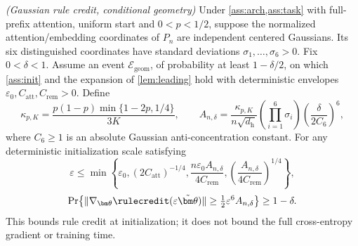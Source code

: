 \item \emph{(Gaussian rule credit, conditional geometry)}
Under \cref{ass:arch,ass:task} with full-prefix attention, uniform start and
$0<p<1/2$, suppose the normalized attention/embedding coordinates of $P_n$
are independent centered Gaussians. Its six distinguished coordinates have
standard deviations $\sigma_1,\ldots,\sigma_6>0$. Fix $0<\delta<1$.
Assume an event $\mathcal E_{\mathrm{geom}}$, of probability at least
$1-\delta/2$, on which \cref{ass:init} and the expansion of
\cref{lem:leading} hold with deterministic envelopes
$\varepsilon_0,C_{\mathrm{att}},C_{\mathrm{rem}}>0$. Define
\begin{equation}\label{eq:t2-gaussian-threshold}
 \kappa_{p,K}=\frac{p(1-p)\min\{1-2p,1/4\}}{3K},\qquad
 A_{n,\delta}=\frac{\kappa_{p,K}}{n\sqrt{d_{\mathrm h}}}
 \left(\prod_{i=1}^6\sigma_i\right)
 \left(\frac{\delta}{2C_6}\right)^6,
\end{equation}
where $C_6\ge1$ is an absolute Gaussian anti-concentration constant.
For any deterministic initialization scale satisfying
\begin{equation}\label{eq:t2-gaussian-epsilon}
 \varepsilon\le\min\left\{\varepsilon_0,(2C_{\mathrm{att}})^{-1/4},
 \frac{n\varepsilon_0 A_{n,\delta}}{4C_{\mathrm{rem}}},
 \left(\frac{A_{n,\delta}}{4C_{\mathrm{rem}}}\right)^{1/4}\right\},
\end{equation}
\begin{equation}\label{eq:t2-gaussian-credit}
 \Pr\!\left\{\|\nabla_{\bm\theta}\rulecredit
 (\varepsilon\tilde{\bm\theta})\|
 \ge\tfrac12\varepsilon^6 A_{n,\delta}\right\}\ge1-\delta.
\end{equation}
This bounds rule credit at initialization; it does not bound the full
cross-entropy gradient or training time.
